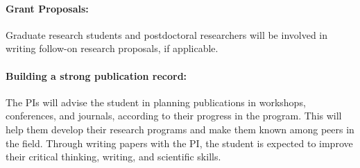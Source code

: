 \documentclass[12pt]{article}
\begin{document}
\paragraph{Grant Proposals:}  Graduate research students and postdoctoral researchers will be involved in writing follow-on research proposals, if applicable.

\paragraph{Building a strong publication record:}  The PIs will advise the student in planning publications in workshops, conferences, and journals, according to their progress in the program. This will help them develop their research programs and make them known among peers in the field. Through writing papers with the PI, the student is expected to improve their critical thinking, writing, and scientific skills.
\end{document}
